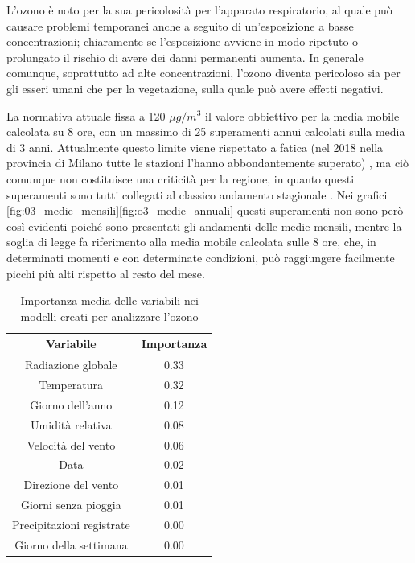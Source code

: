 \documentclass[a4paper]{report}
\begin{document}
L'ozono è noto per la sua pericolosità per l'apparato respiratorio, al quale può causare problemi temporanei anche a seguito di un'esposizione a basse concentrazioni; chiaramente se l'esposizione avviene in modo ripetuto o prolungato il rischio di avere dei danni permanenti aumenta. In generale comunque, soprattutto ad alte concentrazioni, l'ozono diventa pericoloso sia per gli esseri umani che per la vegetazione, sulla quale può avere effetti negativi.

La normativa attuale fissa a 120 $\mu g/m^3$ il valore obbiettivo per la media mobile calcolata su 8 ore, con un massimo di 25 superamenti annui calcolati sulla media di 3 anni. Attualmente questo limite viene rispettato a fatica (nel 2018 nella provincia di Milano tutte le stazioni l'hanno abbondantemente superato)
, ma ciò comunque non costituisce una criticità per la regione, in quanto questi superamenti sono tutti collegati al classico andamento stagionale \cite{arpa2018rapporto}. Nei grafici \ref{fig:03_medie_mensili}\ref{fig:o3_medie_annuali} questi superamenti non sono però così evidenti poiché sono presentati gli andamenti delle medie mensili, mentre la soglia di legge fa riferimento alla media mobile calcolata sulle 8 ore, che, in determinati momenti e con determinate condizioni, può raggiungere facilmente picchi più alti rispetto al resto del mese.

\begin{table}[h!]
\centering
\begin{tabular}{ |c c| }
	\hline
	Variabile & Importanza \\
	\hline
	Radiazione globale & 0.33 \\
	Temperatura & 0.32 \\
	Giorno dell'anno & 0.12 \\
	Umidità relativa & 0.08 \\
	Velocità del vento & 0.06 \\
	Data & 0.02 \\
	Direzione del vento & 0.01 \\
	Giorni senza pioggia & 0.01 \\
	Precipitazioni registrate & 0.00 \\
	Giorno della settimana & 0.00 \\
	\hline
\end{tabular}
\caption{Importanza media delle variabili nei modelli creati per analizzare l'ozono}
\label{table:importanza_o3}
\end{table}
\end{document}
